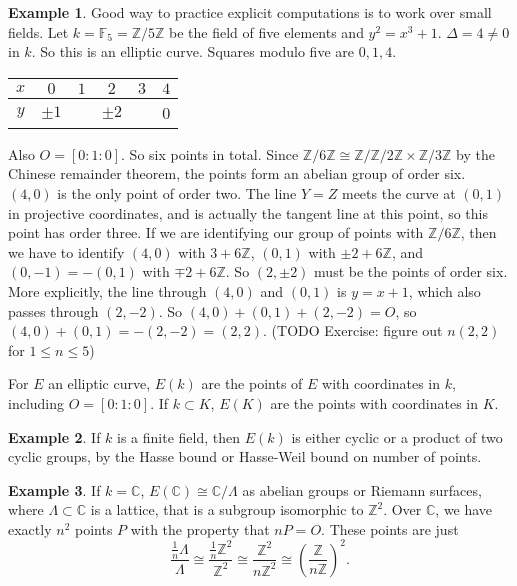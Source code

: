 \documentclass{article}
\newcommand{\F}{\mathbb{F}}
\newcommand{\Z}{\mathbb{Z}}
\newcommand{\C}{\mathbb{C}}
\newcommand{\rb}[1]{\left( #1 \right)}
\renewcommand{\sb}[1]{\left[ #1 \right]}
\theoremstyle{definition}\newtheorem{definition}{Definition}[section]
\theoremstyle{definition}\newtheorem{remark}[definition]{Remark}
\theoremstyle{definition}\newtheorem*{example}{Example}
\theoremstyle{definition}\newtheorem*{note}{Note}
\begin{document}
\begin{example}
Good way to practice explicit computations is to work over small fields. Let $ k = \F_5 = \Z / 5\Z $ be the field of five elements and $ y^2 = x^3 + 1 $. $ \Delta = 4 \ne 0 $ in $ k $. So this is an elliptic curve. Squares modulo five are $ 0, 1, 4 $.
\begin{center}
\begin{tabular}{c|ccccc}
$ x $ & $ 0 $ & $ 1 $ & $ 2 $ & $ 3 $ & $ 4 $ \\
\hline
$ y $ & $ \pm 1 $ & & $ \pm 2 $ & & 0
\end{tabular}
\end{center}
Also $ O = \sb{0 : 1 : 0} $. So six points in total. Since $ \Z / 6\Z \cong \Z / \Z / 2\Z \times \Z / 3\Z $ by the Chinese remainder theorem, the points form an abelian group of order six. $ \rb{4, 0} $ is the only point of order two. The line $ Y = Z $ meets the curve at $ \rb{0, 1} $ in projective coordinates, and is actually the tangent line at this point, so this point has order three. If we are identifying our group of points with $ \Z / 6\Z $, then we have to identify $ \rb{4, 0} $ with $ 3 + 6\Z $, $ \rb{0, 1} $ with $ \pm 2 + 6\Z $, and $ \rb{0, -1} = -\rb{0, 1} $ with $ \mp 2 + 6\Z $. So $ \rb{2, \pm 2} $ must be the points of order six. More explicitly, the line through $ \rb{4, 0} $ and $ \rb{0, 1} $ is $ y = x + 1 $, which also passes through $ \rb{2, -2} $. So $ \rb{4, 0} + \rb{0, 1} + \rb{2, -2} = O $, so $ \rb{4, 0} + \rb{0, 1} = -\rb{2, -2} = \rb{2, 2} $. (TODO Exercise: figure out $ n\rb{2, 2} $ for $ 1 \le n \le 5 $)
\end{example}

For $ E $ an elliptic curve, $ E\rb{k} $ are the points of $ E $ with coordinates in $ k $, including $ O = \sb{0 : 1 : 0} $. If $ k \subset K $, $ E\rb{K} $ are the points with coordinates in $ K $.

\begin{example}
If $ k $ is a finite field, then $ E\rb{k} $ is either cyclic or a product of two cyclic groups, by the Hasse bound or Hasse-Weil bound on number of points.
\end{example}

\begin{example}
If $ k = \C $, $ E\rb{\C} \cong \C / \Lambda $ as abelian groups or Riemann surfaces, where $ \Lambda \subset \C $ is a lattice, that is a subgroup isomorphic to $ \Z^2 $. Over $ \C $, we have exactly $ n^2 $ points $ P $ with the property that $ nP = O $. These points are just
$$ \dfrac{\tfrac{1}{n}\Lambda}{\Lambda} \cong \dfrac{\tfrac{1}{n}\Z^2}{\Z^2} \cong \dfrac{\Z^2}{n\Z^2} \cong \rb{\dfrac{\Z}{n\Z}}^2. $$
\end{example}
\end{document}
